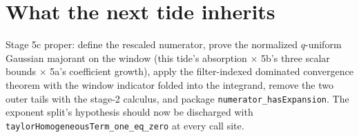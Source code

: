 \documentclass[11pt]{article}
\newcommand{\code}[1]{\texttt{#1}}
\begin{document}
\section{What the next tide inherits}

Stage 5c proper: define the rescaled numerator, prove the normalized
$q$-uniform Gaussian majorant on the window (this tide's absorption
$\times$ 5b's three scalar bounds $\times$ 5a's coefficient growth),
apply the filter-indexed dominated convergence theorem with the
window indicator folded into the integrand, remove the two outer
tails with the stage-2 calculus, and package
\code{numerator\_hasExpansion}. The exponent split's hypothesis
should now be discharged with
\code{taylorHomogeneousTerm\_one\_eq\_zero} at every call site.
\end{document}
